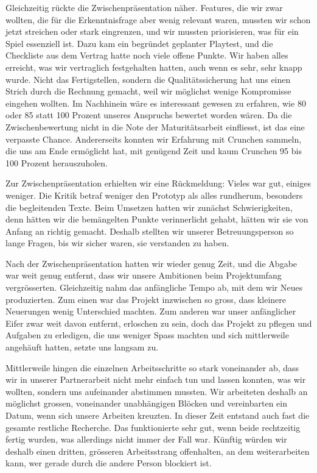 \documentclass[../Main.tex]{subfiles}
\begin{document}
Gleichzeitig rückte die Zwischenpräsentation näher. Features, die wir zwar wollten, die für die Erkenntnisfrage aber wenig relevant waren, mussten wir schon jetzt streichen oder stark eingrenzen, und wir mussten priorisieren, was für ein Spiel essenziell ist. Dazu kam ein begründet geplanter Playtest, und die Checkliste aus dem Vertrag hatte noch viele offene Punkte. Wir haben alles erreicht, was wir vertraglich festgehalten hatten, auch wenn es sehr, sehr knapp wurde. Nicht das Fertigstellen, sondern die Qualitätssicherung hat uns einen Strich durch die Rechnung gemacht, weil wir möglichst wenige Kompromisse eingehen wollten. Im Nachhinein wäre es interessant gewesen zu erfahren, wie 80 oder 85 statt 100 Prozent unseres Anspruchs bewertet worden wären. Da die Zwischenbewertung nicht in die Note der Maturitätsarbeit einfliesst, ist das eine verpasste Chance. Andererseits konnten wir Erfahrung mit Crunchen sammeln, die uns am Ende ermöglicht hat, mit genügend Zeit und kaum Crunchen 95 bis 100 Prozent herauszuholen.

Zur Zwischenpräsentation erhielten wir eine Rückmeldung: Vieles war gut, einiges weniger. Die Kritik betraf weniger den Prototyp als alles rundherum, besonders die begleitenden Texte. Beim Umsetzen hatten wir zunächst Schwierigkeiten, denn hätten wir die bemängelten Punkte verinnerlicht gehabt, hätten wir sie von Anfang an richtig gemacht. Deshalb stellten wir unserer Betreuungsperson so lange Fragen, bis wir sicher waren, sie verstanden zu haben.

Nach der Zwischenpräsentation hatten wir wieder genug Zeit, und die Abgabe war weit genug entfernt, dass wir unsere Ambitionen beim Projektumfang vergrösserten. Gleichzeitig nahm das anfängliche Tempo ab, mit dem wir Neues produzierten. Zum einen war das Projekt inzwischen so gross, dass kleinere Neuerungen wenig Unterschied machten. Zum anderen war unser anfänglicher Eifer zwar weit davon entfernt, erloschen zu sein, doch das Projekt zu pflegen und Aufgaben zu erledigen, die uns weniger Spass machten und sich mittlerweile angehäuft hatten, setzte uns langsam zu.

Mittlerweile hingen die einzelnen Arbeitsschritte so stark voneinander ab, dass wir in unserer Partnerarbeit nicht mehr einfach tun und lassen konnten, was wir wollten, sondern uns aufeinander abstimmen mussten. Wir arbeiteten deshalb an möglichst grossen, voneinander unabhängigen Blöcken und vereinbarten ein Datum, wenn sich unsere Arbeiten kreuzten. In dieser Zeit entstand auch fast die gesamte restliche Recherche. Das funktionierte sehr gut, wenn beide rechtzeitig fertig wurden, was allerdings nicht immer der Fall war. Künftig würden wir deshalb einen dritten, grösseren Arbeitsstrang offenhalten, an dem weiterarbeiten kann, wer gerade durch die andere Person blockiert ist.
\end{document}

